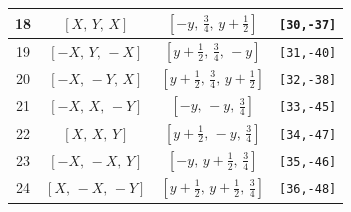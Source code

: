 \documentclass[fleqn,8pt]{jsarticle}
\begin{document}
\begin{longtable}{cccc}
18 & $\left[ X,\, Y,\, X \right]$ & $\left[ - y,\, \frac{3}{4},\, y + \frac{1}{2} \right]$ & {\tt [30,-37]} \\ \hline
19 & $\left[ - X,\, Y,\, - X \right]$ & $\left[ y + \frac{1}{2},\, \frac{3}{4},\, - y \right]$ & {\tt [31,-40]} \\ \hline
20 & $\left[ - X,\, - Y,\, X \right]$ & $\left[ y + \frac{1}{2},\, \frac{3}{4},\, y + \frac{1}{2} \right]$ & {\tt [32,-38]} \\ \hline
21 & $\left[ - X,\, X,\, - Y \right]$ & $\left[ - y,\, - y,\, \frac{3}{4} \right]$ & {\tt [33,-45]} \\ \hline
22 & $\left[ X,\, X,\, Y \right]$ & $\left[ y + \frac{1}{2},\, - y,\, \frac{3}{4} \right]$ & {\tt [34,-47]} \\ \hline
23 & $\left[ - X,\, - X,\, Y \right]$ & $\left[ - y,\, y + \frac{1}{2},\, \frac{3}{4} \right]$ & {\tt [35,-46]} \\ \hline
24 & $\left[ X,\, - X,\, - Y \right]$ & $\left[ y + \frac{1}{2},\, y + \frac{1}{2},\, \frac{3}{4} \right]$ & {\tt [36,-48]} \\
\end{longtable}
\renewcommand{\arraystretch}{1.2}
\end{document}
